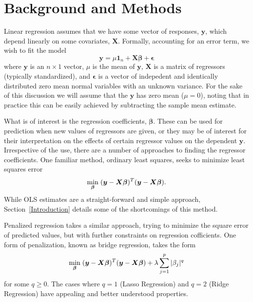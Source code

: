 \documentclass{uwstat572}
\begin{document}
\section{Background and Methods}
Linear regression assumes that we have some vector of responses, $\boldsymbol{y}$, which depend linearly on some covariates, $\boldsymbol{X}$. Formally, accounting for an error term, we wish to fit the model \[
\boldsymbol{y} = \mu \boldsymbol{1}_n + \boldsymbol{X}\boldsymbol{\beta}+\boldsymbol{\epsilon}
\] where $\boldsymbol{y}$ is an $n \times 1$ vector, $\mu$ is the mean of $\boldsymbol{y}$, $\boldsymbol{X}$ is a matrix of regressors (typically standardized), and $\boldsymbol{\epsilon}$ is a vector of indepedent and identically distributed zero mean normal variables with an unknown variance. For the sake of this discussion we will assume that the $\boldsymbol{y}$ has zero mean ($\mu=0$), noting that in practice this can be easily achieved by subtracting the sample mean estimate.

What is of interest is the regression coefficients, $\boldsymbol{\beta}$. These can be used for prediction when new values of regressors are given, or they may be of interest for their interpretation on the effects of certain regressor values on the dependent $\boldsymbol{y}$. Irrespective of the use, there are a number of approaches to finding the regressor coefficients. One familiar method, ordinary least squares, seeks to minimize least squares error\[
\min_{\boldsymbol{\beta}} \hspace{.1cm} (\boldsymbol{y}-\boldsymbol{X}\boldsymbol{\beta})^T(\boldsymbol{y}-\boldsymbol{X}\boldsymbol{\beta}).
\] While OLS estimates are a straight-forward and simple approach, Section~\ref{Introduction} details some of the shortcomings of this method.

Penalized regression takes a similar approach, trying to minimize the square error of predicted values, but with further constraints on regression cofficients. One form of penalization, known as bridge regression, takes the form  \[
\min_{\boldsymbol{\beta}}  \hspace{.1cm} (\boldsymbol{y}-\boldsymbol{X}\boldsymbol{\beta})^T(\boldsymbol{y}-\boldsymbol{X}\boldsymbol{\beta})+\lambda\sum_{j=1}^p|\beta_j|^q
\] for some $q\geq0$.\cite{park2008bayesian} The cases where $q=1$ (Lasso Regression) and $q=2$ (Ridge Regression) have appealing and better understood properties.
\end{document}
